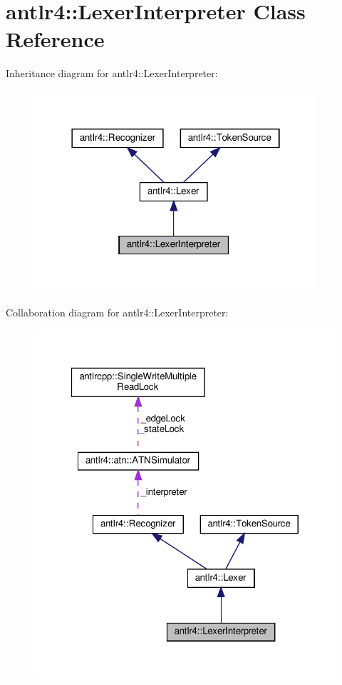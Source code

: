 \hypertarget{classantlr4_1_1LexerInterpreter}{}\section{antlr4\+:\+:Lexer\+Interpreter Class Reference}
\label{classantlr4_1_1LexerInterpreter}


Inheritance diagram for antlr4\+:\+:Lexer\+Interpreter\+:
\nopagebreak
\begin{figure}[H]
\begin{center}
\leavevmode
\includegraphics[width=298pt]{classantlr4_1_1LexerInterpreter__inherit__graph}
\end{center}
\end{figure}


Collaboration diagram for antlr4\+:\+:Lexer\+Interpreter\+:
\nopagebreak
\begin{figure}[H]
\begin{center}
\leavevmode
\includegraphics[width=321pt]{classantlr4_1_1LexerInterpreter__coll__graph}
\end{center}
\end{figure}
